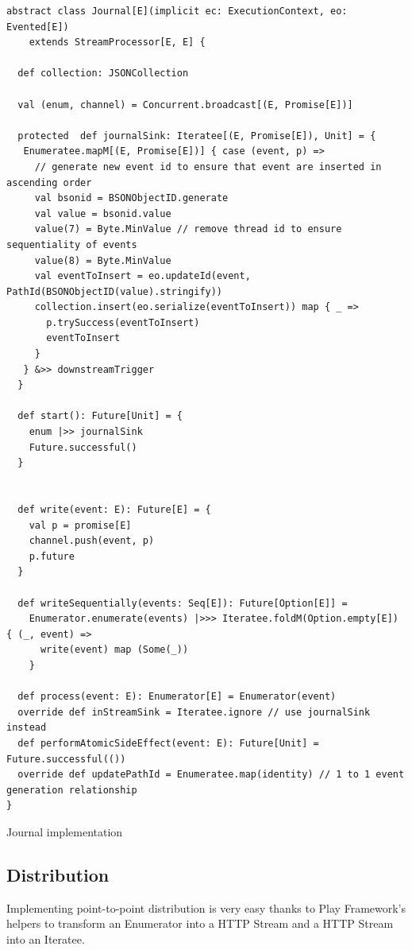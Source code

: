 \begin{listing}[h]
\begin{verbatim}
abstract class Journal[E](implicit ec: ExecutionContext, eo: Evented[E]) 
    extends StreamProcessor[E, E] {

  def collection: JSONCollection

  val (enum, channel) = Concurrent.broadcast[(E, Promise[E])]
  
  protected  def journalSink: Iteratee[(E, Promise[E]), Unit] = {
   Enumeratee.mapM[(E, Promise[E])] { case (event, p) =>
     // generate new event id to ensure that event are inserted in ascending order
     val bsonid = BSONObjectID.generate 
     val value = bsonid.value
     value(7) = Byte.MinValue // remove thread id to ensure sequentiality of events
     value(8) = Byte.MinValue
     val eventToInsert = eo.updateId(event, PathId(BSONObjectID(value).stringify))
     collection.insert(eo.serialize(eventToInsert)) map { _ =>
       p.trySuccess(eventToInsert)
       eventToInsert
     }
   } &>> downstreamTrigger
  }

  def start(): Future[Unit] = {
    enum |>> journalSink
    Future.successful()
  }


  def write(event: E): Future[E] = {
    val p = promise[E]
    channel.push(event, p)
    p.future
  }

  def writeSequentially(events: Seq[E]): Future[Option[E]] =
    Enumerator.enumerate(events) |>>> Iteratee.foldM(Option.empty[E]) { (_, event) =>
      write(event) map (Some(_))
    }

  def process(event: E): Enumerator[E] = Enumerator(event)
  override def inStreamSink = Iteratee.ignore // use journalSink instead
  def performAtomicSideEffect(event: E): Future[Unit] = Future.successful(())
  override def updatePathId = Enumeratee.map(identity) // 1 to 1 event generation relationship
}
\end{verbatim}
\caption{Journal implementation}
\label{lst:journalimpl}
\end{listing}


\subsection{Distribution}

Implementing point-to-point distribution is very easy thanks to Play Framework's helpers to transform an Enumerator into a HTTP Stream and a HTTP Stream into an Iteratee.

